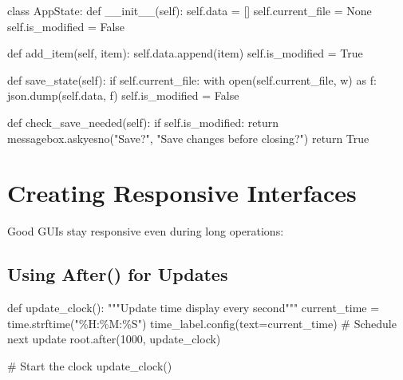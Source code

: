 \documentclass[
  letterpaper,
  DIV=11,
  numbers=noendperiod,
  oneside]{scrreprt}
\newenvironment{Shaded}{}{}
\newcommand{\BuiltInTok}[1]{\textcolor[rgb]{0.84,0.23,0.29}{#1}}
\newcommand{\CommentTok}[1]{\textcolor[rgb]{0.42,0.45,0.49}{#1}}
\newcommand{\ControlFlowTok}[1]{\textcolor[rgb]{0.84,0.23,0.29}{#1}}
\newcommand{\DecValTok}[1]{\textcolor[rgb]{0.00,0.36,0.77}{#1}}
\newcommand{\FunctionTok}[1]{\textcolor[rgb]{0.44,0.26,0.76}{#1}}
\newcommand{\ImportTok}[1]{\textcolor[rgb]{0.01,0.18,0.38}{#1}}
\newcommand{\KeywordTok}[1]{\textcolor[rgb]{0.84,0.23,0.29}{#1}}
\newcommand{\NormalTok}[1]{\textcolor[rgb]{0.14,0.16,0.18}{#1}}
\newcommand{\OperatorTok}[1]{\textcolor[rgb]{0.14,0.16,0.18}{#1}}
\newcommand{\StringTok}[1]{\textcolor[rgb]{0.01,0.18,0.38}{#1}}
\newcommand{\VariableTok}[1]{\textcolor[rgb]{0.89,0.38,0.04}{#1}}
\begin{document}
\begin{Shaded}
\begin{Highlighting}[]
\KeywordTok{class}\NormalTok{ AppState:}
    \KeywordTok{def} \FunctionTok{\_\_init\_\_}\NormalTok{(}\VariableTok{self}\NormalTok{):}
        \VariableTok{self}\NormalTok{.data }\OperatorTok{=}\NormalTok{ []}
        \VariableTok{self}\NormalTok{.current\_file }\OperatorTok{=} \VariableTok{None}
        \VariableTok{self}\NormalTok{.is\_modified }\OperatorTok{=} \VariableTok{False}
        
    \KeywordTok{def}\NormalTok{ add\_item(}\VariableTok{self}\NormalTok{, item):}
        \VariableTok{self}\NormalTok{.data.append(item)}
        \VariableTok{self}\NormalTok{.is\_modified }\OperatorTok{=} \VariableTok{True}
        
    \KeywordTok{def}\NormalTok{ save\_state(}\VariableTok{self}\NormalTok{):}
        \ControlFlowTok{if} \VariableTok{self}\NormalTok{.current\_file:}
            \ControlFlowTok{with} \BuiltInTok{open}\NormalTok{(}\VariableTok{self}\NormalTok{.current\_file, }\StringTok{\textquotesingle{}w\textquotesingle{}}\NormalTok{) }\ImportTok{as}\NormalTok{ f:}
\NormalTok{                json.dump(}\VariableTok{self}\NormalTok{.data, f)}
            \VariableTok{self}\NormalTok{.is\_modified }\OperatorTok{=} \VariableTok{False}
            
    \KeywordTok{def}\NormalTok{ check\_save\_needed(}\VariableTok{self}\NormalTok{):}
        \ControlFlowTok{if} \VariableTok{self}\NormalTok{.is\_modified:}
            \ControlFlowTok{return}\NormalTok{ messagebox.askyesno(}\StringTok{"Save?"}\NormalTok{, }\StringTok{"Save changes before closing?"}\NormalTok{)}
        \ControlFlowTok{return} \VariableTok{True}
\end{Highlighting}
\end{Shaded}

\section{Creating Responsive
Interfaces}\label{creating-responsive-interfaces}

Good GUIs stay responsive even during long operations:

\subsection{Using After() for Updates}\label{using-after-for-updates}

\begin{Shaded}
\begin{Highlighting}[]
\KeywordTok{def}\NormalTok{ update\_clock():}
    \CommentTok{"""Update time display every second"""}
\NormalTok{    current\_time }\OperatorTok{=}\NormalTok{ time.strftime(}\StringTok{"\%H:\%M:\%S"}\NormalTok{)}
\NormalTok{    time\_label.config(text}\OperatorTok{=}\NormalTok{current\_time)}
    \CommentTok{\# Schedule next update}
\NormalTok{    root.after(}\DecValTok{1000}\NormalTok{, update\_clock)}

\CommentTok{\# Start the clock}
\NormalTok{update\_clock()}
\end{Highlighting}
\end{Shaded}
\end{document}
